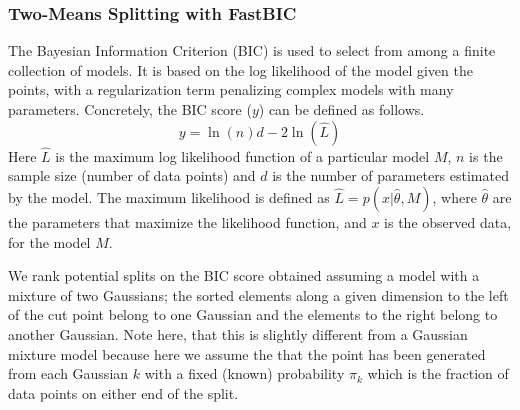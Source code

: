 \subsubsection{Two-Means Splitting with FastBIC }
The Bayesian Information Criterion (BIC) is used to select from among a finite collection of models. It is based on the log likelihood of the model given the points, with a regularization term penalizing complex models with many parameters. Concretely, the BIC score ($y$) can be defined as follows.
\begin{equation}
y = \ln(n)d - 2\ln(\hat{L})
\end{equation}
Here $\hat{L}$ is the maximum log likelihood function of a particular model $M$, 
$n$ is the sample size (number of data points) and $d$ is the number of parameters estimated by the model.
The maximum likelihood is defined as
$\hat{L} =p(x|\hat{\theta}, M)$,  where $\hat{\theta}$ are the parameters that maximize the likelihood function, and $x$ is the observed data, for the model $M$. 
 

We rank potential splits on the BIC score obtained assuming a model with a mixture of two Gaussians; the sorted elements along a given dimension to the left of the cut point belong to one Gaussian and the elements to the right belong to another Gaussian. Note here, that this is slightly different from a Gaussian mixture model because here we assume the that the point has been generated from each Gaussian $k$ with a fixed (known) probability $\pi_k$ which is the fraction of data points on either end of the split.

